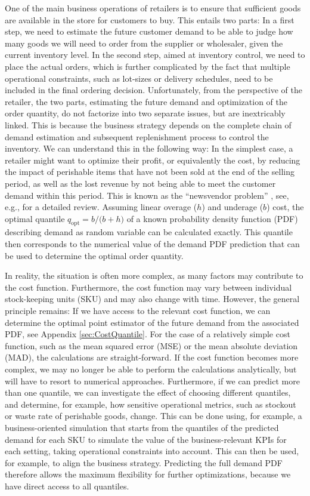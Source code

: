 \documentclass[BCOR=1mm, DIV=calc,10pt,
twoside=true,
twocolumn,
headings=normal]{scrartcl}
\begin{document}
One of the main business operations of retailers is to ensure that sufficient goods are available in the store for customers to buy. This entails two parts: In a first step, we need to estimate the future customer demand to be able to judge how many goods we will need to order from the supplier or wholesaler, given the current inventory level. In the second step, aimed at inventory control, we need to place the actual orders, which is further complicated by the fact that multiple operational constraints, such as lot-sizes or delivery schedules, need to be included in the final ordering decision. Unfortunately, from the perspective of the retailer, the two parts, estimating the future demand and optimization of the order quantity, do not factorize into two separate issues, but are inextricably linked. This is because the business strategy depends on the complete chain of demand estimation and subsequent replenishment process to control the inventory. We can understand this in the following way: In the simplest case, a retailer might want to optimize their profit, or equivalently the cost, by reducing the impact of perishable items that have not been sold at the end of the selling period, as well as the lost revenue by not being able to meet the customer demand within this period. This is known as the ``newsvendor problem'' \cite{Edgeworth}, see, e.g., \cite{Khouja1999537} for a detailed review. Assuming linear overage ($h$) and underage ($b$) cost, the optimal quantile $q_{\mathrm{opt}} = {b}/{(b+h})$ of a known probability density function (PDF) describing demand as random variable can be calculated exactly. This quantile then corresponds to the numerical value of the demand PDF prediction that can be used to determine the optimal order quantity.

In reality, the situation is often more complex, as many factors may contribute to the cost function. Furthermore, the cost function may vary between individual stock-keeping units (SKU) and may also change with time. However, the general principle remains: If we have access to the relevant cost function, we can determine the optimal point estimator of the future demand from the associated PDF, see Appendix \ref{sec:CostQuantile}. For the case of a relatively simple cost function, such as the mean squared error (MSE) or the mean absolute deviation (MAD), the calculations are straight-forward. If the cost function becomes more complex, we may no longer be able to perform the calculations analytically, but will have to resort to numerical approaches. Furthermore, if we can predict more than one quantile, we can investigate the effect of choosing different quantiles, and determine, for example, how sensitive operational metrics, such as stockout or waste rate of perishable goods, change. This can be done using, for example, a business-oriented simulation that starts from the quantiles of the predicted demand for each SKU to simulate the value of the business-relevant KPIs for each setting, taking operational constraints into account. This can then be used, for example, to align the business strategy. Predicting the full demand PDF therefore allows the maximum flexibility for further optimizations, because we have direct access to all quantiles.
\end{document}
